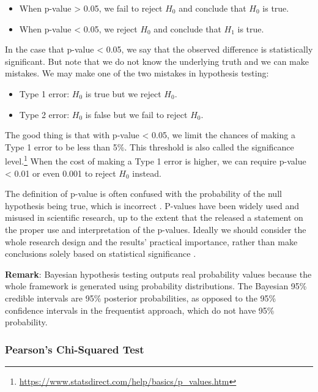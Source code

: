 \documentclass[
]{article}
\providecommand{\tightlist}{%
  \setlength{\itemsep}{0pt}\setlength{\parskip}{0pt}}
\begin{document}
\begin{itemize}
\tightlist
\item
  When p-value \textgreater{} 0.05, we fail to reject \(H_0\) and
  conclude that \(H_0\) is true.
\item
  When p-value \textless{} 0.05, we reject \(H_0\) and conclude that
  \(H_1\) is true.
\end{itemize}

In the case that p-value \textless{} 0.05, we say that the observed
difference is statistically significant. But note that we do not know
the underlying truth and we can make mistakes. We may make one of the
two mistakes in hypothesis testing:

\begin{itemize}
\tightlist
\item
  Type 1 error: \(H_0\) is true but we reject \(H_0\).
\item
  Type 2 error: \(H_0\) is false but we fail to reject \(H_0\).
\end{itemize}

The good thing is that with p-value \textless{} 0.05, we limit the
chances of making a Type 1 error to be less than 5\%. This threshold is
also called the significance level.\footnote{\url{https://www.statsdirect.com/help/basics/p_values.htm}}
When the cost of making a Type 1 error is higher, we can require p-value
\textless{} 0.01 or even 0.001 to reject \(H_0\) instead.

The definition of p-value is often confused with the probability of the
null hypothesis being true, which is incorrect \citep{goodman2008dirty}.
P-values have been widely used and misused in scientific research, up to
the extent that the \citet{american2016statement} released a statement
on the proper use and interpretation of the p-values. Ideally we should
consider the whole research design and the results' practical
importance, rather than make conclusions solely based on statistical
significance \citep{wasserstein2019moving}.

\textbf{Remark}: Bayesian hypothesis testing
\citep{kruschke2018bayesian} outputs real probability values because the
whole framework is generated using probability distributions. The
Bayesian 95\% credible intervals are 95\% posterior probabilities, as
opposed to the 95\% confidence intervals in the frequentist approach,
which do not have 95\% probability.

\hypertarget{pearsons-chi-squared-test}{%
\subsubsection{Pearson's Chi-Squared
Test}\label{pearsons-chi-squared-test}}
\end{document}
